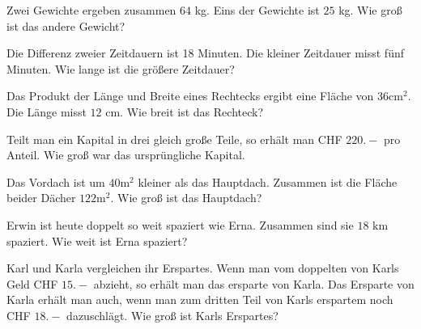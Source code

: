 \begin{bbwAufgabenBlock}
\item Zwei Gewichte ergeben zusammen $64$ kg. Eins der Gewichte ist
$25$ kg. Wie groß ist das andere Gewicht?


\item Die Differenz zweier Zeitdauern ist 18 Minuten. Die kleiner
Zeitdauer misst fünf Minuten. Wie lange ist die größere Zeitdauer?


\item Das Produkt der Länge und Breite eines Rechtecks ergibt eine
Fläche von $36 \text{cm}^2$. Die Länge misst $12$ cm. Wie breit ist
das Rechteck?



\item Teilt man ein Kapital in drei gleich große Teile, so erhält man
CHF $220.-$ pro Anteil. Wie groß war das ursprüngliche Kapital.


\item Das Vordach ist um $40 \text{m}^2$ kleiner als das
Hauptdach. Zusammen ist die Fläche beider Dächer $122 \text{m}^2$. Wie
groß ist das Hauptdach?

\noTRAINER{\newpage}

\item Erwin ist heute doppelt so weit spaziert wie Erna. Zusammen sind
sie $18 \text{ km}$ spaziert. Wie weit ist Erna spaziert?


\item Karl und Karla vergleichen ihr Erspartes. Wenn man vom doppelten
von Karls Geld CHF $15.-$ abzieht, so erhält man das ersparte von
Karla. Das Ersparte von Karla erhält man auch, wenn man zum dritten
Teil von Karls erspartem noch CHF $18.-$ dazuschlägt. Wie groß ist
Karls Erspartes?

\end{bbwAufgabenBlock}
